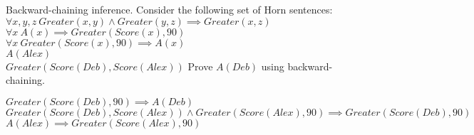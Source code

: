 \documentclass[12pt]{article}
\newenvironment{problem}[2][Problem]{\begin{trivlist}
\item[\hskip \labelsep {\bfseries #1}\hskip \labelsep {\bfseries #2.}]}{\end{trivlist}}
\begin{document}
\begin{problem}{4}
	Backward-chaining inference. Consider the following set of Horn sentences:
	$\forall x,y,z ~ Greater(x,y) \wedge Greater(y,z) \implies Greater(x,z)$ \\
	$\forall x ~ A(x) \implies Greater(Score(x),90)$ \\
	$\forall x ~ Greater(Score(x),90) \implies A(x)$ \\
	$A(Alex)$ \\
	$Greater(Score(Deb),Score(Alex))$
	Prove $A(Deb)$ using backward-chaining.

	\vspace{0.25cm}
	\noindent
	$Greater(Score(Deb),90) \implies A(Deb)$ \\
	$Greater(Score(Deb),Score(Alex)) \wedge Greater(Score(Alex),90) \implies Greater(Score(Deb),90)$ \\
	$A(Alex) \implies Greater(Score(Alex),90)$
\end{problem}
\end{document}
